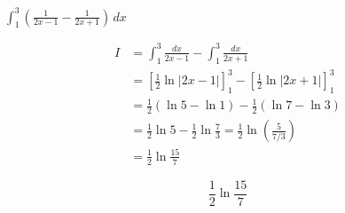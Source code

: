 $\displaystyle \int_{1}^{3}\left(\frac{1}{2x-1}-\frac{1}{2x+1}\right)\,dx$

\nopagebreak
\begin{align*}
I &= \int_{1}^{3} \frac{dx}{2x-1} - \int_{1}^{3} \frac{dx}{2x+1} \\
&= \left[ \frac{1}{2} \ln|2x-1| \right]_{1}^{3} - \left[ \frac{1}{2} \ln|2x+1| \right]_{1}^{3} \\
&= \frac{1}{2} (\ln 5 - \ln 1) - \frac{1}{2} (\ln 7 - \ln 3) \\
&= \frac{1}{2} \ln 5 - \frac{1}{2} \ln \frac{7}{3} = \frac{1}{2} \ln \left( \frac{5}{7/3} \right) \\
&= \frac{1}{2} \ln \frac{15}{7}
\end{align*}

\[
\boxed{\displaystyle \frac{1}{2} \ln \frac{15}{7}}
\]
